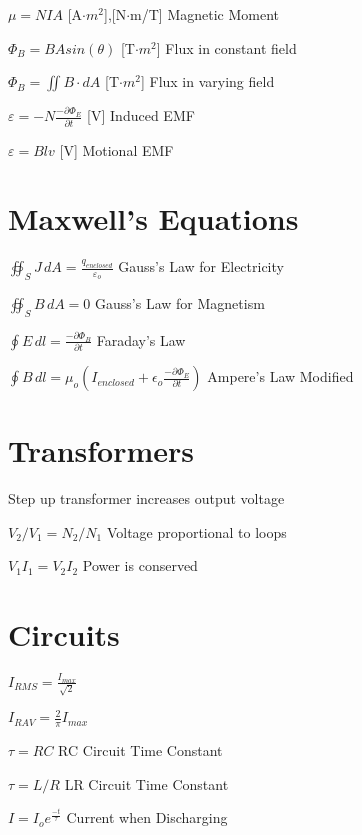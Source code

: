 \documentclass{article}
\begin{document}
\LARGE{$\mu=NIA$}
\large{[A$\cdot{m^2}$],[N$\cdot$m/T]}
\large Magnetic Moment

\LARGE{$\Phi_B=BAsin(\theta)$}
\large{[T$\cdot{m^2}$]}
\large Flux in constant field

\LARGE{$\Phi_B=\iint B\cdot{dA}$}
\large{[T$\cdot{m^2}$]}
\large Flux in varying field

\LARGE{$\varepsilon=-N\frac{-\partial\Phi_E}{\partial{t}}$}
\large{[V]}
\large Induced EMF

\LARGE{$\varepsilon=Blv$}
\large{[V]}
\large Motional EMF

\vspace{.2cm}

\section{Maxwell's Equations}

\LARGE ${\oiint_S J \,dA = \frac
{q_{enclosed}}
{\varepsilon_o }}$
\large Gauss's Law for Electricity

\LARGE ${\oiint_S B \,dA = 0}$
\large Gauss's Law for Magnetism

\LARGE$\oint E \,dl =
\frac{-\partial\Phi_B}{\partial{t}}$
\large{Faraday's Law}

\LARGE$\oint B \,dl = \mu_o(I_{enclosed}+\epsilon_o
\frac{-\partial\Phi_E}{\partial{t}})$
\large {Ampere's Law Modified}


\section {Transformers}
\large {Step up transformer increases output voltage }

\LARGE$V_2/V_1=N_2/N_1$
\large {Voltage proportional to loops}

\LARGE$V_1I_1=V_2I_2$
\large {Power is conserved}



\section{Circuits}

\LARGE $I_{RMS}=\frac{I_{max}}{\sqrt{2}}$

\LARGE $I_{RAV}=\frac{2}{\pi}I_{max}$



\LARGE$\tau = RC$
\large{RC Circuit Time Constant}

\LARGE$\tau = L/R$
\large{LR Circuit Time Constant}

\LARGE$I = I_o{e^{\frac{-t}{\tau}}}$
\large{Current when Discharging}
\end{document}
